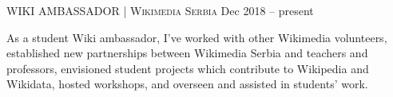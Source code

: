 %
\begin{minipage}[t]{\linewidth}\vspace{\subsectionSpace}
{\subtitleFont\bold WIKI AMBASSADOR \extraLight\scshape | Wikimedia Serbia}\newline
{\vfill\vspace{\dateTopMargin}\dateFont\extraLight Dec 2018 -- present\alignRight}\linebreak\newline

\vspace{\contentTopMargin}
{\contentFont As a student Wiki ambassador, I’ve worked with other Wikimedia volunteers, established new partnerships between Wikimedia Serbia and teachers and professors, envisioned student projects which contribute to Wikipedia and Wikidata, hosted workshops, and overseen and assisted in students’ work.}
\end{minipage}\newline%